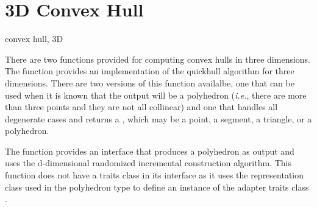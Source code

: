 \section{3D Convex Hull}
\begin{ccPackage}{convex hull, 3D}

There are two functions provided for computing convex hulls in three 
dimensions.  The function 
 provides an 
implementation of the quickhull algorithm \cite{bdh-qach-96} for three 
dimensions.  There are two versions of this
function availalbe, one that can be used when it is known that the output
will be a polyhedron (\textit{i.e.}, there are more than three points and
they are not all collinear) and one that handles all degenerate cases
and returns a , which may be a point, a segment, a
triangle, or a polyhedron.

The function 
provides an interface that produces a polyhedron as output and uses the
d-dimensional randomized incremental construction algorithm.  This function
does not have a traits class in its interface as it uses the representation
class  used in the polyhedron type to define an instance of the 
adapter traits class .

\end{ccPackage}

